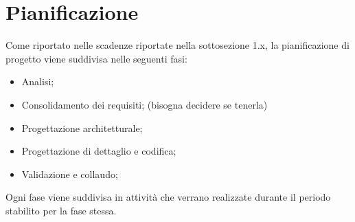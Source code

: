 \section{Pianificazione}
Come riportato nelle scadenze riportate nella sottosezione 1.x, la pianificazione di progetto viene suddivisa nelle seguenti fasi:
\begin{itemize}
	\item Analisi;
	\item Consolidamento dei requisiti; (bisogna decidere se tenerla)
	\item Progettazione architetturale;
	\item Progettazione di dettaglio e codifica;
	\item Validazione e collaudo;
\end{itemize}
Ogni fase viene suddivisa in attività che verrano realizzate durante il periodo stabilito per la fase stessa.




